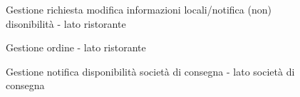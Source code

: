 \documentclass[11pt]{article} %
\begin{document}
\begin{figure}[!ht]
\begin{center}
\caption{Gestione richiesta modifica informazioni locali/notifica (non) disonibilità - lato ristorante}
\end{center}
\end{figure}


\begin{figure}[!ht]
\begin{center}
\caption{Gestione ordine - lato ristorante}
\end{center}
\end{figure}

\begin{figure}[!ht]
\begin{center}
\caption{Gestione notifica disponibilità società di consegna - lato società di consegna}
\end{center}
\end{figure}
\end{document}
